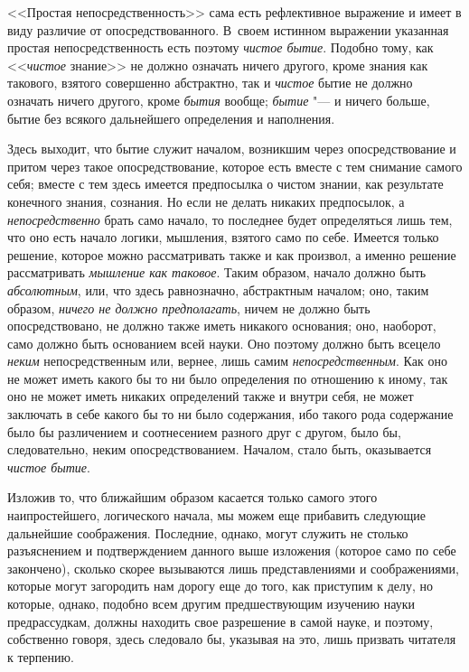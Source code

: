 <<Простая непосредственность>> сама есть рефлективное выражение и имеет в виду
различие от опосредствованного. В~своем истинном выражении указанная
простая непосредственность есть поэтому {\em чистое
бытие}. Подобно тому, как <<{\em чистое} знание>> не
должно означать ничего другого, кроме знания как такового, взятого
совершенно абстрактно, так и {\em чистое} бытие не
должно означать ничего другого, кроме {\em бытия}
вообще; {\em бытие} "--- и ничего больше, бытие без
всякого дальнейшего определения и наполнения.

Здесь выходит, что бытие служит началом, возникшим через опосредствование и
притом через такое опосредствование, которое есть вместе с тем снимание
самого себя; вместе с тем здесь имеется предпосылка о чистом знании, как
результате конечного знания, сознания. Но если не делать никаких
предпосылок, а {\em непосредственно} брать само начало,
то последнее будет определяться лишь тем, что оно есть начало логики,
мышления, взятого само по себе. Имеется только решение, которое можно
рассматривать также и как произвол, а именно решение рассматривать
{\em мышление как таковое}. Таким образом, начало должно
быть {\em абсолютным}, или, что здесь равнозначно,
абстрактным началом; оно, таким образом, {\em ничего не
должно предполагать}, ничем не должно быть опосредствовано, не должно также
иметь никакого основания; оно, наоборот, само должно быть основанием всей
науки. Оно поэтому должно быть всецело {\em неким}
непосредственным или, вернее, лишь самим
{\em непосредственным}. Как оно не может иметь какого
бы то ни было определения по отношению к иному, так оно не может иметь
никаких определений также и внутри себя, не может заключать в себе какого
бы то ни было содержания, ибо такого рода содержание было бы различением и
соотнесением разного друг с другом, было бы, следовательно, неким
опосредствованием. Началом, стало быть, оказывается {\em чистое бытие}.

Изложив то, что ближайшим образом касается только самого этого
наипростейшего, логического начала, мы можем еще прибавить следующие
дальнейшие соображения. Последние, однако, могут служить не столько
разъяснением и подтверждением данного выше изложения (которое само по себе
закончено), сколько скорее вызываются лишь представлениями и соображениями,
которые могут загородить нам дорогу еще до того, как приступим к делу, но
которые, однако, подобно всем другим предшествующим изучению науки
предрассудкам, должны находить свое разрешение в самой науке, и поэтому,
собственно говоря, здесь следовало бы, указывая на это, лишь призвать
читателя к терпению.

